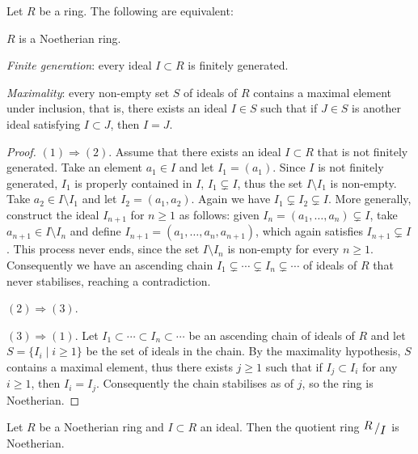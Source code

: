 \begin{prop}
	Let $R$ be a ring. The following are equivalent:
	\begin{enumerateprop}
		\item $R$ is a Noetherian ring.
		\item \emph{Finite generation}: every ideal $I \subset R$ is finitely generated.
		\item \emph{Maximality}: every non-empty set $S$ of ideals of $R$ contains a maximal element under inclusion, that is, there exists an ideal $I \in S$ such that if $J \in S$ is another ideal satisfying $I \subset J$, then $I = J$.
	\end{enumerateprop}
\end{prop}
\begin{proof}
	$(1) \Rightarrow (2)$. Assume that there exists an ideal $I \subset R$ that is not finitely generated. Take an element $a_1 \in I$ and let $I_1 = (a_1)$. Since $I$ is not finitely generated, $I_1$ is properly contained in $I$, $I_1 \subsetneq I$, thus the set $I \setminus I_1$ is non-empty. Take $a_2 \in I \setminus I_1$ and let $I_2 = (a_1,a_2)$. Again we have $I_1 \subsetneq I_2 \subsetneq I$. More generally, construct the ideal $I_{n+1}$ for $n \geq 1$ as follows: given $I_n = (a_1, \ldots, a_n) \subsetneq I$, take $a_{n+1} \in I \setminus I_n$ and define $I_{n+1} = (a_1, \ldots, a_n, a_{n+1})$, which again satisfies $I_{n+1} \subsetneq I$. This process never ends, since the set $I \setminus I_n$ is non-empty for every $n \geq 1$. Consequently we have an ascending chain $I_1 \subsetneq \cdots \subsetneq I_n \subsetneq \cdots$ of ideals of $R$ that never stabilises, reaching a contradiction.
	
	$(2) \Rightarrow (3)$. 
	
	$(3) \Rightarrow (1)$. Let $I_1 \subset \cdots \subset I_n \subset \cdots$ be an ascending chain of ideals of $R$ and let $S = \{ I_i \mid i \geq 1 \}$ be the set of ideals in the chain. By the maximality hypothesis, $S$ contains a maximal element, thus there exists $j \geq 1$ such that if $I_j \subset I_i$ for any $i \geq 1$, then $I_i = I_j$. Consequently the chain stabilises as of $j$, so the ring is Noetherian. 
	
\end{proof}

\begin{prop}
	Let $R$ be a Noetherian ring and $I \subset R$ an ideal. Then the quotient ring $\quotient{R}{I}$ is Noetherian.
\end{prop}

